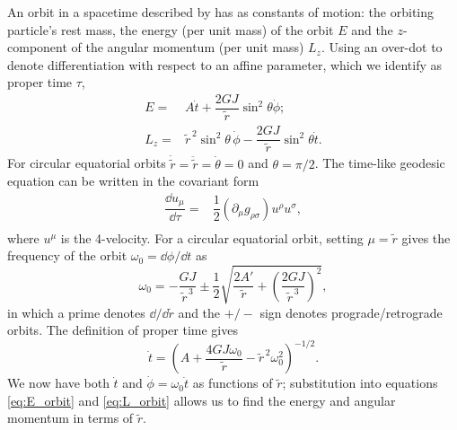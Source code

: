 An orbit in a spacetime described by  has as constants of motion: the orbiting particle's rest mass, the energy (per unit mass) of the orbit $E$ and the $z$-component of the angular momentum (per unit mass) $L_z$. Using an over-dot to denote differentiation with respect to an affine parameter, which we identify as proper time $\tau$,
\begin{align}
\label{eq:E_orbit}
E = {} & A\dot{t} + \dfrac{2GJ}{\widetilde{r}} \sin^2\theta\dot{\phi}; \\
L_z = {} & \widetilde{r}^{\,2}\sin^2\theta\, \dot{\phi} - \dfrac{2GJ}{\widetilde{r}} \sin^2\theta\dot{t} .
\label{eq:L_orbit}
\end{align}
For circular equatorial orbits $\dot{\widetilde{r}} = \ddot{\widetilde{r}} = \dot{\theta}= 0$ and $\theta = \pi/2$. The time-like geodesic equation can be written in the covariant form
\begin{align}
\dfrac{\dd u_\mu}{\dd \tau} = {} & \dfrac{1}{2} \left(\partial_\mu g_{\rho\sigma} \right) u^\rho u^\sigma,\\
 & \nonumber
\end{align}
where $u^\mu$ is the 4-velocity. For a circular equatorial orbit, setting $\mu = \widetilde{r}$ gives the frequency of the orbit $\omega_0 = \dd\phi/\dd t$ as
\begin{equation}
\omega_0 = -\dfrac{GJ}{\widetilde{r}^{\,3}} \pm \dfrac{1}{2} \sqrt{\dfrac{2A'}{\widetilde{r}} + \left(\dfrac{2GJ}{\widetilde{r}^{\,3}}\right)^2},
\label{eq:omz}
\end{equation}
in which a prime denotes $\dd/\dd\widetilde{r}$ and the $+/-$ sign denotes prograde/retrograde orbits. The definition of proper time gives
\begin{equation}
\dot{t} = \left(A + \dfrac{4GJ\omega_0}{\widetilde{r}} - \widetilde{r}^{\,2}\omega_0^2 \right)^{-1/2}.
\end{equation}
We now have both $\dot{t}$ and $\dot{\phi} = \omega_0\dot{t}$ as functions of $\widetilde{r}$; substitution into equations \eqref{eq:E_orbit} and \eqref{eq:L_orbit} allows us to find the energy and angular momentum in terms of $\widetilde{r}$.


